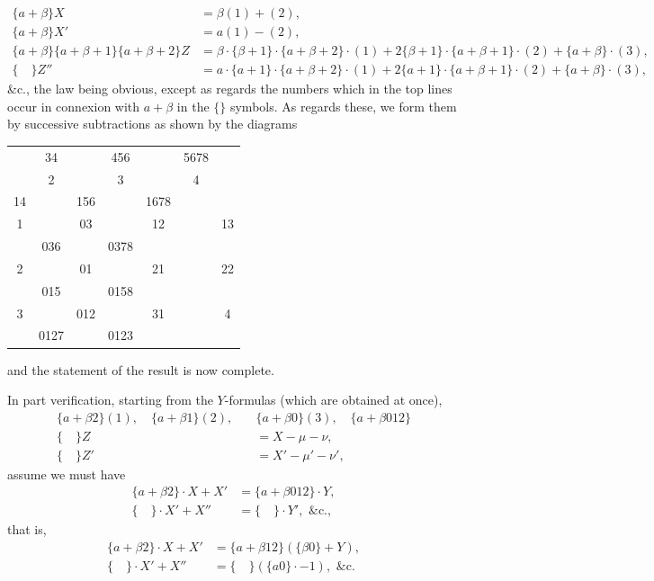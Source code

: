 \documentclass[11pt,a4paper]{book}
\begin{document}
\begin{align*}
\{a + \beta\}X &= \beta(1) + (2), \\
\{a + \beta\}X' &= a(1) - (2), \\
\{a + \beta\}\{a + \beta + 1\}\{a + \beta + 2\}Z &= \beta \cdot \{\beta + 1\} \cdot \{a + \beta + 2\} \cdot (1) + 2\{\beta + 1\} \cdot \{a + \beta + 1\} \cdot (2) + \{a + \beta\} \cdot (3), \\
\{ \quad \}Z'' &= a \cdot \{a + 1\} \cdot \{a + \beta + 2\} \cdot (1) + 2\{a + 1\} \cdot \{a + \beta + 1\} \cdot (2) + \{a + \beta\} \cdot (3),
\end{align*}
\&c., the law being obvious, except as regards the numbers which in the top lines occur in connexion with $a + \beta$ in the $\{\}$ symbols. As regards these, we form them by successive subtractions as shown by the diagrams
\begin{center}
\begin{tabular}{ccccccc}
 & 34 & & 456 & & 5678 \\
 & 2 & & 3 & & 4 \\
14 & & 156 & & 1678 \\
1 & & 03 & & 12 & & 13 \\
 & 036 & & 0378 \\
2 & & 01 & & 21 & & 22 \\
 & 015 & & 0158 \\
3 & & 012 & & 31 & & 4 \\
 & 0127 & & 0123
\end{tabular}
\end{center}
and the statement of the result is now complete.

In part verification, starting from the $Y$-formulas (which are obtained at once),
\begin{align*}
\{a + \beta 2\}(1), \quad \{a + \beta 1\}(2), \quad &\{a + \beta 0\}(3), \quad \{a + \beta 012\} \\
\{ \quad \}Z &= X - \mu - \nu, \\
\{ \quad \}Z' &= X' - \mu' - \nu',
\end{align*}
assume we must have
\begin{align*}
\{a + \beta 2\} \cdot X + X' &= \{a + \beta 012\} \cdot Y, \\
\{ \quad \} \cdot X' + X'' &= \{ \quad \} \cdot Y', \text{ \&c.},
\end{align*}
that is,
\begin{align*}
\{a + \beta 2\} \cdot X + X' &= \{a + \beta 12\} (\{\beta 0\} + Y), \\
\{ \quad \} \cdot X' + X'' &= \{ \quad \} (\{a0\} \cdot -1), \text{ \&c.}
\end{align*}
\end{document}
